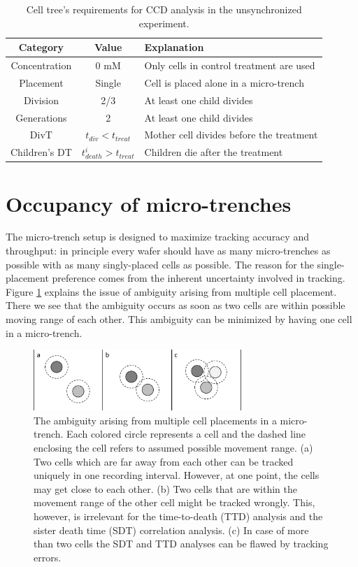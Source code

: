 \documentclass[pdftex,12pt,a4paper]{report}
\begin{document}
\begin{table}[H]
\centering
\begin{tabular}{ c | c | l }
\hline
Category & Value & Explanation \\
\hline\hline
Concentration & 0 mM & Only cells in control treatment are used\\
Placement & Single & Cell is placed alone in a micro-trench \\
Division & 2/3 & At least one child divides\\
Generations & 2 & At least one child divides \\
DivT & $t_{div} < t_{treat}$ & Mother cell divides before the treatment\\
Children's DT & $t^i_{death} > t_{treat}$  & Children die after the treatment\\
\hline
\end{tabular}
\caption[Cell tree's requirements for CCD analysis in the unsynchronized experiment]{Cell tree's requirements for CCD analysis in the unsynchronized experiment.}
\label{table:cell_reqs_ccd}
\end{table}

\section{Occupancy of micro-trenches}
\label{section:occupancy_of_microtrench}

The micro-trench setup is designed to maximize tracking accuracy and throughput: in principle every wafer should have as many micro-trenches as possible with as many singly-placed cells as possible. The reason for the single-placement preference comes from the inherent uncertainty involved in tracking. Figure \ref{fig:cell_placements} explains the issue of ambiguity arising from multiple cell placement. There we see that the ambiguity occurs as soon as two cells are within possible moving range of each other. This ambiguity can be minimized by having one cell in a micro-trench.

\begin{figure}[H]
\centering
\includegraphics[width=0.7\textwidth]{images/cells_confusion.pdf}
\caption[Illustration of SVM in 2D]{The ambiguity arising from multiple cell placements in a micro-trench.  Each colored circle represents a cell and the dashed line enclosing the cell refers to assumed possible movement range. (a) Two cells which are far away from each other can be tracked uniquely in one recording interval. However, at one point, the cells may get close to each other. (b) Two cells that are within the movement range of the other cell might be tracked wrongly. This, however, is irrelevant for the time-to-death (TTD) analysis and  the sister death time (SDT) correlation analysis. (c) In case of more than two cells the SDT and TTD analyses can be flawed by tracking errors.}
\label{fig:cell_placements}
\end{figure}
\end{document}
